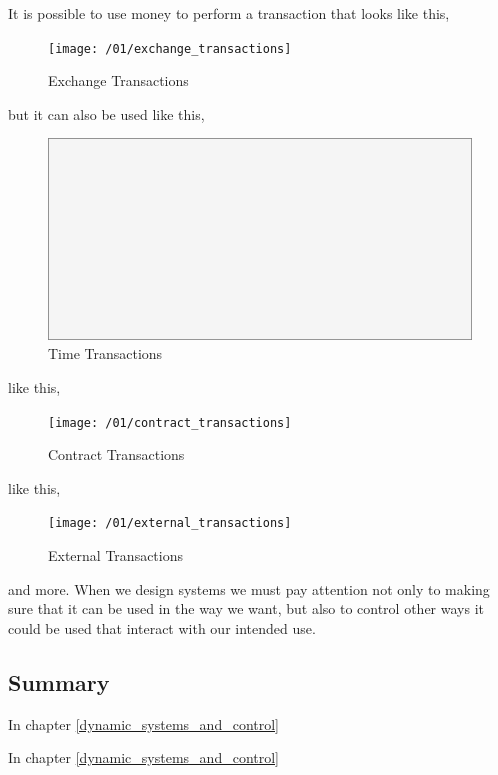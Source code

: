 It is possible to use money to perform a transaction that looks like this,

\begin{figure}[H]
\centering
\texttt{[image: /01/exchange\_transactions]}
\caption{Exchange Transactions}
\label{fig:exchange_transactions}
\end{figure}

but it can also be used like this,

\begin{figure}[H]
\centering
\includegraphics[scale=0.48]{blank}
\caption{Time Transactions}
\label{fig:time_transactions}
\end{figure}

like this,

\begin{figure}[H]
\centering
\texttt{[image: /01/contract\_transactions]}
\caption{Contract Transactions}
\label{fig:contract_transactions}
\end{figure}

like this,

\begin{figure}[H]
\centering
\texttt{[image: /01/external\_transactions]}
\caption{External Transactions}
\label{fig:external_transactions}
\end{figure}

and more. When we design systems we must pay attention not only to making sure that it can be used
in the way we want, but also to control other ways it could be used that interact with our intended
use.

\subsection{Summary}

In chapter \ref{dynamic_systems_and_control}

In chapter \ref{dynamic_systems_and_control}


